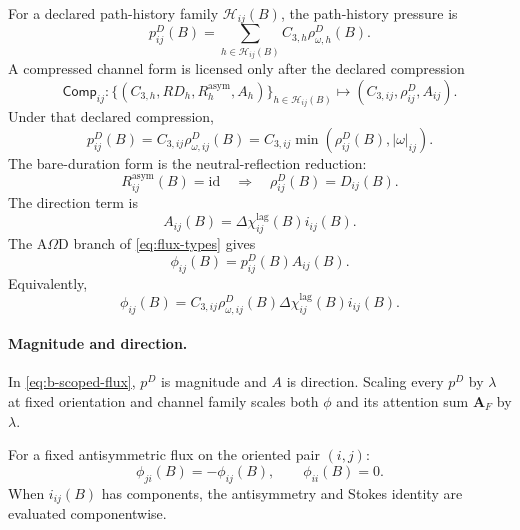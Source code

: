 For a declared path-history family \(\mathcal H_{ij}(B)\), the path-history pressure is
\begin{equation}
p^D_{ij}(B)
=
\sum_{h\in\mathcal H_{ij}(B)}
C_{3,h}\rho^D_{\omega,h}(B).
\label{eq:path-history-pressure}
\end{equation}
A compressed channel form is licensed only after the declared compression
\begin{equation}
\mathsf{Comp}_{ij}:
\{(C_{3,h},RD_h,R^{\mathrm{asym}}_h,A_h)\}_{h\in\mathcal H_{ij}(B)}
\mapsto
(C_{3,ij},\rho^D_{ij},A_{ij}).
\label{eq:path-history-compression}
\end{equation}
Under that declared compression,
\begin{equation}
p^D_{ij}(B)=C_{3,ij}\rho^D_{\omega,ij}(B)
=
C_{3,ij}\min\!\left(\rho^D_{ij}(B),|\omega|_{ij}\right).
\label{eq:b-scoped-channel-pressure}
\end{equation}
The bare-duration form is the neutral-reflection reduction:
\[
R^{\mathrm{asym}}_{ij}(B)=\mathrm{id}
\quad\Rightarrow\quad
\rho^D_{ij}(B)=D_{ij}(B).
\]
The direction term is
\begin{equation}
A_{ij}(B)=\Delta\chi^{\mathrm{lag}}_{ij}(B)i_{ij}(B).
\label{eq:b-scoped-channel-attention}
\end{equation}
The A\(\Omega\)D branch of \eqref{eq:flux-types} gives
\begin{equation}
\phi_{ij}(B)=p^D_{ij}(B)A_{ij}(B).
\label{eq:b-scoped-flux}
\end{equation}
Equivalently,
\begin{equation}
\phi_{ij}(B)=
C_{3,ij}\rho^D_{\omega,ij}(B)
\Delta\chi^{\mathrm{lag}}_{ij}(B)i_{ij}(B).
\label{eq:b-scoped-flux-expanded}
\end{equation}
\paragraph{Magnitude and direction.}
In \eqref{eq:b-scoped-flux}, \(p^D\) is magnitude and \(A\) is direction.
Scaling every \(p^D\) by \(\lambda\) at fixed orientation and channel family
scales both \(\phi\) and its attention sum \(\mathbf A_F\) by \(\lambda\).

For a fixed antisymmetric flux on the oriented pair \((i,j)\):
\begin{equation}
\phi_{ji}(B)=-\phi_{ij}(B),
\qquad
\phi_{ii}(B)=0.
\label{eq:b-scoped-flux-antisymmetry}
\end{equation}
When \(i_{ij}(B)\) has components, the antisymmetry and Stokes identity are evaluated componentwise.

